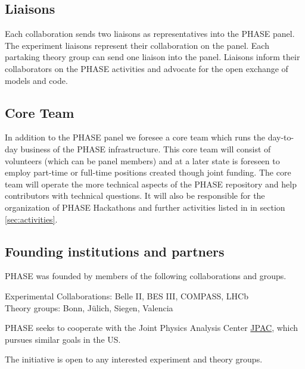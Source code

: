\subsection{Liaisons}
Each collaboration sends two liaisons as representatives into the PHASE panel. The experiment liaisons represent their collaboration on the panel. Each partaking theory group can send one liaison into the panel. Liaisons inform their collaborators on the PHASE activities and advocate for the open exchange of models and code. 

\subsection{Core Team}
In addition to the PHASE panel we foresee a core team which runs the day-to-day business of the PHASE infrastructure. This core team will consist of volunteers (which can be panel members) and at a later state is foreseen to employ part-time or full-time positions created though joint funding. The core team will operate the more technical aspects of the PHASE repository and help contributors with technical questions. It will also be responsible for the organization of PHASE Hackathons and further activities listed in in section \ref{sec:activities}.

\subsection{Founding institutions and partners}
PHASE was founded by members of the following collaborations and groups.

Experimental Collaborations: Belle II, BES III, COMPASS, LHCb \\
Theory groups: Bonn, J\"ulich, Siegen, Valencia

PHASE seeks to cooperate with the Joint Physics Analysis Center \href{https://jpac.jlab.org/}{JPAC}, which pursues similar goals in the US.

The initiative is open to any interested experiment and theory groups.